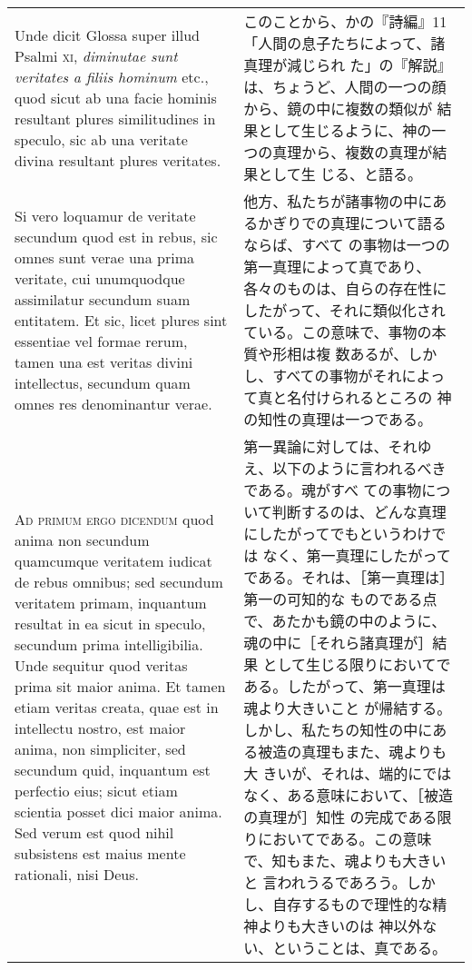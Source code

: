 \documentclass[10pt]{jsarticle} %
\begin{document}
\begin{longtable}{p{21em}p{21em}}
\\

Unde dicit Glossa super illud Psalmi {\scshape xi}, {\itshape
diminutae sunt veritates a filiis hominum} etc., quod sicut ab una
facie hominis resultant plures similitudines in speculo, sic ab una
veritate divina resultant plures veritates.

&

このことから、かの『詩編』11「人間の息子たちによって、諸真理が減じられ
 た」の『解説』は、ちょうど、人間の一つの顔から、鏡の中に複数の類似が
 結果として生じるように、神の一つの真理から、複数の真理が結果として生
 じる、と語る。

\\

Si vero loquamur de veritate secundum quod est in rebus, sic omnes
sunt verae una prima veritate, cui unumquodque assimilatur secundum
suam entitatem. Et sic, licet plures sint essentiae vel formae rerum,
tamen una est veritas divini intellectus, secundum quam omnes res
denominantur verae.

&

他方、私たちが諸事物の中にあるかぎりでの真理について語るならば、すべて
 の事物は一つの第一真理によって真であり、各々のものは、自らの存在性に
 したがって、それに類似化されている。この意味で、事物の本質や形相は複
 数あるが、しかし、すべての事物がそれによって真と名付けられるところの
 神の知性の真理は一つである。

\\

{\scshape Ad primum ergo dicendum} quod anima non secundum quamcumque
veritatem iudicat de rebus omnibus; sed secundum veritatem primam,
inquantum resultat in ea sicut in speculo, secundum prima
intelligibilia. Unde sequitur quod veritas prima sit maior anima. Et
tamen etiam veritas creata, quae est in intellectu nostro, est maior
anima, non simpliciter, sed secundum quid, inquantum est perfectio
eius; sicut etiam scientia posset dici maior anima. Sed verum est quod
nihil subsistens est maius mente rationali, nisi Deus.

&

第一異論に対しては、それゆえ、以下のように言われるべきである。魂がすべ
ての事物について判断するのは、どんな真理にしたがってでもというわけでは
なく、第一真理にしたがってである。それは、［第一真理は］第一の可知的な
ものである点で、あたかも鏡の中のように、魂の中に［それら諸真理が］結果
として生じる限りにおいてである。したがって、第一真理は魂より大きいこと
が帰結する。しかし、私たちの知性の中にある被造の真理もまた、魂よりも大
きいが、それは、端的にではなく、ある意味において、［被造の真理が］知性
の完成である限りにおいてである。この意味で、知もまた、魂よりも大きいと
言われうるであろう。しかし、自存するもので理性的な精神よりも大きいのは
神以外ない、ということは、真である。


\end{longtable}
\end{document}
